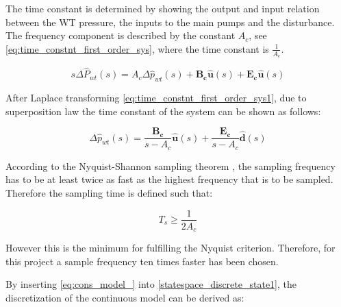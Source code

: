 The time constant is determined by showing the output and input relation between the WT pressure, the inputs to the main pumps and the disturbance. The frequency component is described by the constant $A_c$, see \eqref{eq:time_constnt_first_order_sys}, where the time constant is $\frac{1}{A_c}$.

\begin{equation}
  s\Delta \hat{P}_{wt}(s) = A_c \Delta \hat{p}_{wt}(s)  + \bm{B_c} \bm{\hat{u}}(s) + \bm{E_c} \bm{\hat{u}} (s)
    \label{eq:time_constnt_first_order_sys1}
\end{equation}

After Laplace transforming \eqref{eq:time_constnt_first_order_sys1}, due to superposition law the time constant of the system can be shown as follows: 

\begin{equation}
  \Delta \hat{p}_{wt}(s) = \frac{\bm{B_c}}{s-A_c} \bm{\hat{u}}(s) + \frac{\bm{E_c}}{s-A_c} \bm{\hat{d}}(s)
  \label{eq:time_constnt_first_order_sys}
\end{equation}

According to the Nyquist-Shannon sampling theorem \citep{franklin1994feedback},
the sampling frequency has to be at least twice as fast as the highest frequency that is to be sampled. Therefore the sampling time is defined such that:

\begin{equation}
T_s \geq \frac{1}{2A_c}
 \label{sampling}
\end{equation}

However this is the minimum for fulfilling the Nyquist criterion. Therefore, for this project a sample frequency ten times faster has been chosen.



By inserting \eqref{eq:cons_model_} into \eqref{statespace_discrete_state1}, the discretization of the continuous model can be derived as:

